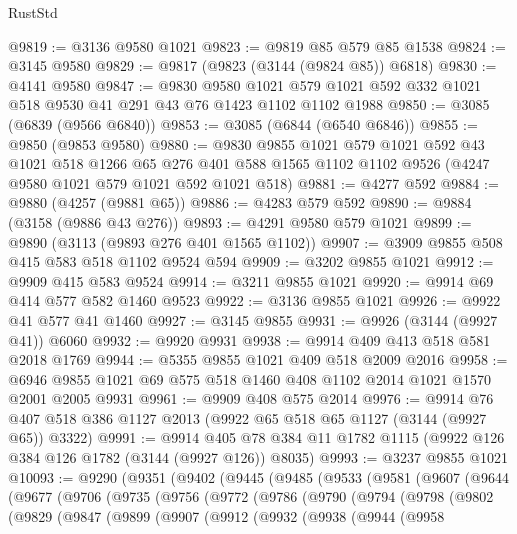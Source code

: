 \begin{lexlean}{RustStd}
\begin{coremodule}
@9819 := @3136 @9580 @1021
@9823 := @9819 @85 @579 @85 @1538
@9824 := @3145 @9580
@9829 := @9817 (@9823 (@3144 (@9824 @85)) @6818)
@9830 := @4141 @9580
@9847 := @9830
    @9580
    @1021
    @579
    @1021
    @592
    @332
    @1021
    @518
    @9530
    @41
    @291
    @43
    @76
    @1423
    @1102
    @1102
    @1988
@9850 := @3085 (@6839 (@9566 @6840))
@9853 := @3085 (@6844 (@6540 @6846))
@9855 := @9850 (@9853 @9580)
@9880 := @9830
    @9855
    @1021
    @579
    @1021
    @592
    @43
    @1021
    @518
    @1266
    @65
    @276
    @401
    @588
    @1565
    @1102
    @1102
    @9526
    (@4247 @9580 @1021 @579 @1021 @592 @1021 @518)
@9881 := @4277 @592
@9884 := @9880 (@4257 (@9881 @65))
@9886 := @4283 @579 @592
@9890 := @9884 (@3158 (@9886 @43 @276))
@9893 := @4291 @9580 @579 @1021
@9899 := @9890 (@3113 (@9893 @276 @401 @1565 @1102))
@9907 := @3909 @9855 @508 @415 @583 @518 @1102 @9524 @594
@9909 := @3202 @9855 @1021
@9912 := @9909 @415 @583 @9524
@9914 := @3211 @9855 @1021
@9920 := @9914 @69 @414 @577 @582 @1460 @9523
@9922 := @3136 @9855 @1021
@9926 := @9922 @41 @577 @41 @1460
@9927 := @3145 @9855
@9931 := @9926 (@3144 (@9927 @41)) @6060
@9932 := @9920 @9931
@9938 := @9914 @409 @413 @518 @581 @2018 @1769
@9944 := @5355 @9855 @1021 @409 @518 @2009 @2016
@9958 := @6946 @9855 @1021 @69 @575 @518 @1460 @408 @1102 @2014 @1021 @1570 @2001 @2005 @9931
@9961 := @9909 @408 @575 @2014
@9976 := @9914 @76 @407 @518 @386 @1127 @2013 (@9922 @65 @518 @65 @1127 (@3144 (@9927 @65)) @3322)
@9991 := @9914 @405 @78 @384 @11 @1782 @1115 (@9922 @126 @384 @126 @1782 (@3144 (@9927 @126)) @8035)
@9993 := @3237 @9855 @1021
@10093 := @9290
    (@9351
      (@9402
        (@9445
          (@9485
            (@9533
              (@9581
                (@9607
                  (@9644
                    (@9677
                      (@9706
                        (@9735
                          (@9756
                            (@9772
                              (@9786
                                (@9790
                                  (@9794
                                    (@9798
                                      (@9802
                                        (@9829
                                          (@9847
                                            (@9899
                                              (@9907
                                                (@9912
                                                  (@9932
                                                    (@9938
                                                      (@9944
                                                        (@9958

\end{coremodule}
\end{lexlean}
